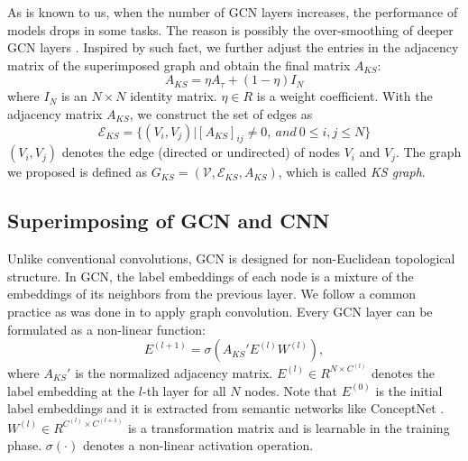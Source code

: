 \documentclass[letterpaper]{article} \usepackage{aaai20}  \usepackage{times}  \usepackage{helvet} \usepackage{courier}  \usepackage[hyphens]{url}  \usepackage{graphicx} \usepackage{subfigure}
\begin{document}
As is known to us, when the number of GCN layers increases, the performance of models drops in some tasks. The reason is possibly the over-smoothing of deeper GCN layers \cite{chen2019multi}. Inspired by such fact, we further adjust the entries in the adjacency matrix of the superimposed graph and obtain the final matrix $A_{KS}$:
\begin{equation} \label{threshold}
	A_{KS} = \eta A_{\tau} + (1 - \eta) \mathit{I}_N
\end{equation}
where $\mathit{I}_N$ is an $N \times N$ identity matrix. $\eta \in R$ is a weight coefficient.
With the adjacency matrix $A_{KS}$, we construct the set of edges as
\begin{equation}
	\mathcal{E}_{KS} = \{(V_i, V_j) \vert [A_{KS}]_{ij} \neq 0, \ and\  0 \leq i, j \leq N\}
\end{equation}
$(V_i, V_j)$ denotes the edge (directed or undirected) of nodes $V_i$ and $V_j$. The graph we proposed is defined as $G_{KS} = (\mathcal{V}, \mathcal{E}_{KS}, A_{KS})$, which is called \emph{KS graph}.

















\subsection{Superimposing of GCN and CNN}
Unlike conventional convolutions, GCN is designed for non-Euclidean topological structure. In GCN, the label embeddings of each node is a mixture of the embeddings of its neighbors from the previous layer. We follow a common practice as was done in \cite{kipf2016semi,chen2019multi} to apply graph convolution. Every GCN layer can be formulated as a non-linear function: 
\begin{equation} \label{eq:gcn0}
	E^{(l+1)} = \sigma(A_{KS}'E^{(l)}W^{(l)}),
\end{equation}
where $A_{KS}'$ is the normalized adjacency matrix. $E^{(l)}\in R^{N \times C^{(l)}}$ denotes the label embedding at the $l$-th layer for all $N$ nodes. Note that $E^{(0)}$ is the initial label embeddings and it is extracted from semantic networks like ConceptNet \cite{speer2017conceptnet}. $W^{(l)} \in R^{C^{(l)} \times C^{(l+1)}}$ is a transformation matrix and is learnable in the training phase. $\sigma(\cdot)$ denotes a non-linear activation operation.
\end{document}
